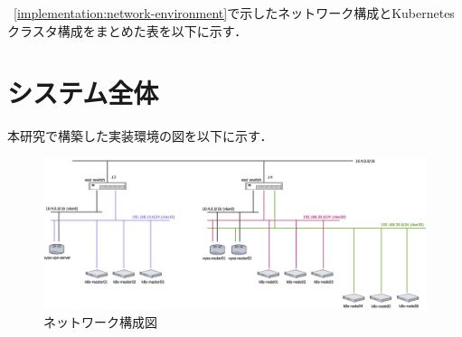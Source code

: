 ~\ref{implementation:network-environment}で示したネットワーク構成とKubernetesクラスタ構成をまとめた表を以下に示す．

\section{システム全体}
\label{implementation:system}
本研究で構築した実装環境の図を以下に示す．

\begin{figure}[htbp]
  \begin{center}
    \includegraphics[width=\textwidth]{./figures/network-diagram.jpg}
    \caption{ネットワーク構成図}
  \end{center}
\end{figure}

